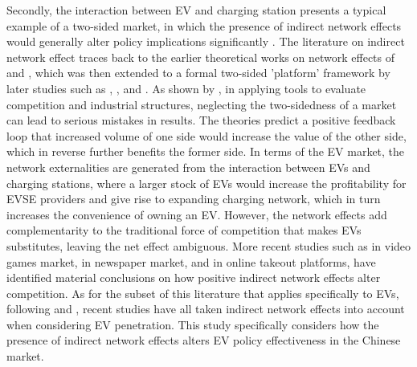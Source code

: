 \documentclass[12pt]{article}
\begin{document}
Secondly, the interaction between EV and charging station presents a typical example of a two-sided market,
in which the presence of indirect network effects would generally alter policy implications significantly \citep{rapson_economics_2021}. 
The literature on indirect network effect traces back to the earlier theoretical works on network effects of \citet{katz_network_1985} and \citep{farrell_standardization_1985},
which was then extended to a formal two-sided 'platform' framework by later studies such as \citet{rochet_platform_2003}, \citet{wright_one-sided_2004}, and \citet{armstrong_competition_2006}. 
As shown by \citet{wright_one-sided_2004}, in applying tools to evaluate competition and industrial structures, neglecting the two-sidedness of a market can lead to serious mistakes in results.
The theories predict a positive feedback loop that increased volume of one side would increase the value of the other side, which in reverse further benefits the former side.
In terms of the EV market, the network externalities are generated from the interaction between EVs and charging stations, 
where a larger stock of EVs would increase the profitability for EVSE providers and give rise to expanding charging network, which in turn increases the convenience of owning an EV.
However, the network effects add complementarity to the traditional force of competition that makes EVs substitutes, leaving the net effect ambiguous.
More recent studies such as \citet{clements_indirect_2005} in video games market, \citet{filistrucchi_assessing_2012} in newspaper market, 
and \citet{reshef_smaller_2023} in online takeout platforms, have identified material conclusions on how positive indirect network effects alter competition.
As for the subset of this literature that applies specifically to EVs, following \citet{li_market_2017} and \citet{springel_network_2021}, recent studies have all taken indirect network effects into account when considering EV penetration.
This study specifically considers how the presence of indirect network effects alters EV policy effectiveness in the Chinese market. \\
\end{document}
